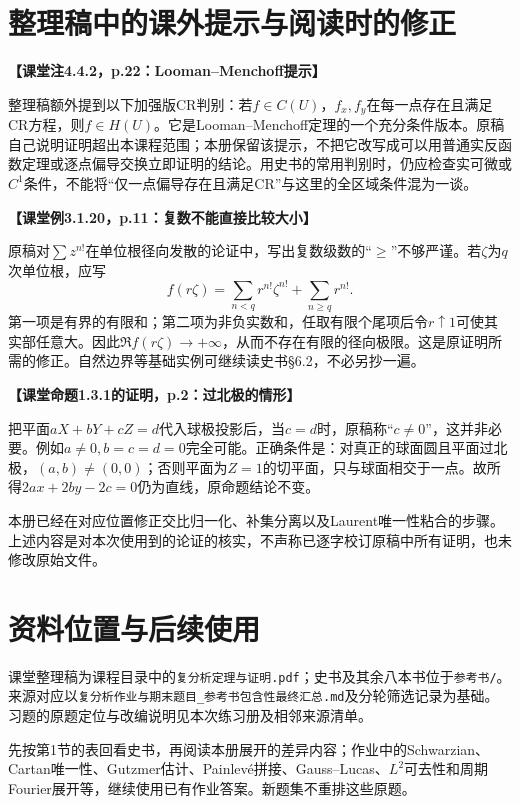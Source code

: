 \documentclass[11pt,a4paper,fontset=fandol]{ctexart}
\theoremstyle{definition}\newtheorem{theorem}{定理}[section]\newtheorem{proposition}[theorem]{命题}\newtheorem{definition}[theorem]{定义}
\newcommand{\src}[1]{\par\noindent\textbf{【#1】}\par\nopagebreak}
\begin{document}
\section{整理稿中的课外提示与阅读时的修正}
\src{课堂注4.4.2，p.22：Looman--Menchoff提示}
整理稿额外提到以下加强版CR判别：若$f\in C(U)$，$f_x,f_y$在每一点存在且满足CR方程，则$f\in H(U)$。它是Looman--Menchoff定理的一个充分条件版本。原稿自己说明证明超出本课程范围；本册保留该提示，不把它改写成可以用普通实反函数定理或逐点偏导交换立即证明的结论。用史书的常用判别时，仍应检查实可微或$C^1$条件，不能将“仅一点偏导存在且满足CR”与这里的全区域条件混为一谈。

\src{课堂例3.1.20，p.11：复数不能直接比较大小}
原稿对$\sum z^{n!}$在单位根径向发散的论证中，写出复数级数的“$\ge$”不够严谨。若$\zeta$为$q$次单位根，应写
\[f(r\zeta)=\sum_{n<q}r^{n!}\zeta^{n!}+\sum_{n\ge q}r^{n!}.\]
第一项是有界的有限和；第二项为非负实数和，任取有限个尾项后令$r\uparrow1$可使其实部任意大。因此$\Re f(r\zeta)\to+\infty$，从而不存在有限的径向极限。这是原证明所需的修正。自然边界等基础实例可继续读史书§6.2，不必另抄一遍。

\src{课堂命题1.3.1的证明，p.2：过北极的情形}
把平面$aX+bY+cZ=d$代入球极投影后，当$c=d$时，原稿称“$c\ne0$”，这并非必要。例如$a\ne0,b=c=d=0$完全可能。正确条件是：对真正的球面圆且平面过北极，$(a,b)\ne(0,0)$；否则平面为$Z=1$的切平面，只与球面相交于一点。故所得$2ax+2by-2c=0$仍为直线，原命题结论不变。

本册已经在对应位置修正交比归一化、补集分离以及Laurent唯一性粘合的步骤。上述内容是对本次使用到的论证的核实，不声称已逐字校订原稿中所有证明，也未修改原始文件。

\section*{资料位置与后续使用}
课堂整理稿为课程目录中的\texttt{复分析定理与证明.pdf}；史书及其余八本书位于\texttt{参考书/}。来源对应以\texttt{复分析作业与期末题目\_参考书包含性最终汇总.md}及分轮筛选记录为基础。习题的原题定位与改编说明见本次练习册及相邻来源清单。

先按第1节的表回看史书，再阅读本册展开的差异内容；作业中的Schwarzian、Cartan唯一性、Gutzmer估计、Painlevé拼接、Gauss--Lucas、$L^2$可去性和周期Fourier展开等，继续使用已有作业答案。新题集不重排这些原题。
\end{document}
